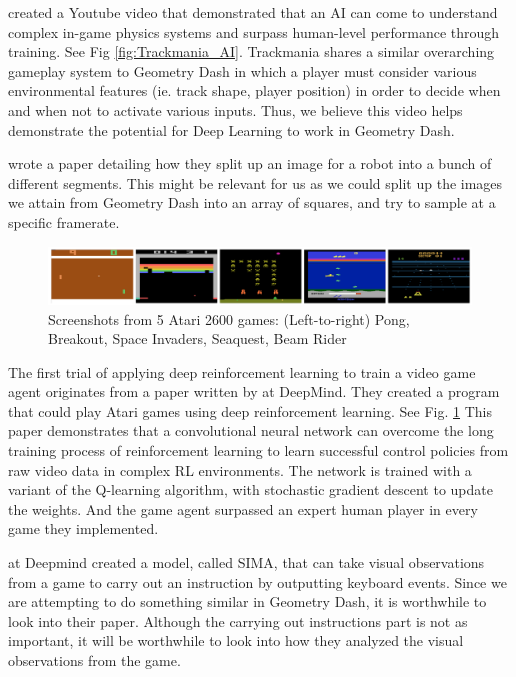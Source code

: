 \documentclass{article} %
\begin{document}
\cite{Trackmania+AI} created a Youtube video that demonstrated that an AI 
can come to understand complex in-game physics systems and surpass
human-level performance through training. See Fig \ref{fig:Trackmania_AI}.
Trackmania shares a similar overarching gameplay system to Geometry Dash in 
which a player must 
consider various environmental features (ie. track shape, player 
position) in order to decide when and when not to activate various 
inputs. Thus, we believe this video helps demonstrate the potential 
for Deep Learning to work in Geometry Dash.

\cite{Robot+Object+Avoidance+Method} wrote a paper detailing how 
they split up an image for a robot into a bunch of different segments. 
This might be relevant for us as we could split up the images we attain
from Geometry Dash into an array of squares, and try to sample at a
specific framerate.

\begin{figure}[!h]
\begin{center}
\includegraphics[width=1.0\textwidth]{Figs/Deepmind_atari.png}
\end{center}
\caption{Screenshots from 5 Atari 2600 games: 
(Left-to-right) Pong, Breakout, Space Invaders, Seaquest, Beam Rider
\citep{Playing+Atari+with+Deep+Reinforcement+Learning}}
\label{fig:Deep_mind_Atari_AI}
\end{figure}

The first trial of applying deep reinforcement learning to train a
video game agent originates from a paper written by
\cite{Playing+Atari+with+Deep+Reinforcement+Learning} at 
DeepMind. They created a program that could play Atari games using
deep reinforcement learning. See Fig. \ref{fig:Deep_mind_Atari_AI}
This paper demonstrates that a convolutional neural network can 
overcome the long training process of reinforcement learning to 
learn successful control policies from raw video data in complex 
RL environments. The network is trained with a variant of the 
Q-learning algorithm, with stochastic gradient descent to update 
the weights. And the game agent surpassed an expert human player 
in every game they implemented.

\cite{DeepMind+Sima} at Deepmind created a model, called SIMA, 
that can take visual observations from a game to carry out an 
instruction by outputting keyboard events. Since we are 
attempting to do something similar in Geometry Dash, it is 
worthwhile to look into their paper. Although the carrying 
out instructions part is not as important, it will be worthwhile
to look into how they analyzed the visual observations from the 
game.
\end{document}
